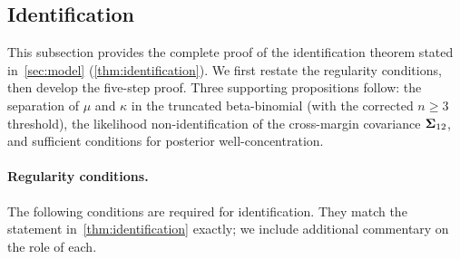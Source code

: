
\subsection{Identification}\label{smb:identification}

This subsection provides the complete proof of the identification theorem
stated in~\cref{sec:model} (\cref{thm:identification}). We first restate
the regularity conditions, then develop the five-step proof. Three
supporting propositions follow: the separation of $\mu$ and $\kappa$ in
the truncated beta-binomial (with the corrected $n \ge 3$ threshold), the
likelihood non-identification of the cross-margin covariance
$\boldsymbol{\Sigma}_{12}$, and sufficient conditions for posterior well-concentration.


\paragraph{Regularity conditions.}
The following conditions are required for identification. They match the
statement in~\cref{thm:identification} exactly; we include additional
commentary on the role of each.

